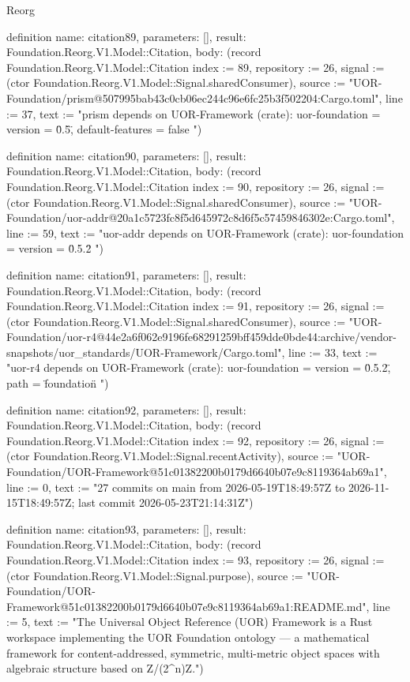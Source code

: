 \begin{lexlean}{Reorg}
\begin{semanticmodule}
definition{
  name: citation89,
  parameters: [],
  result: Foundation.Reorg.V1.Model::Citation,
  body: (record Foundation.Reorg.V1.Model::Citation {index := 89, repository := 26, signal := (ctor Foundation.Reorg.V1.Model::Signal.sharedConsumer), source := "UOR-Foundation/prism@507995bab43c0cb06ec244c96e6fc25b3f502204:Cargo.toml", line := 37, text := "prism depends on UOR-Framework (crate): uor-foundation = { version = \"0.5\", default-features = false }"})
}

definition{
  name: citation90,
  parameters: [],
  result: Foundation.Reorg.V1.Model::Citation,
  body: (record Foundation.Reorg.V1.Model::Citation {index := 90, repository := 26, signal := (ctor Foundation.Reorg.V1.Model::Signal.sharedConsumer), source := "UOR-Foundation/uor-addr@20a1c5723fc8f5d645972c8d6f5c57459846302e:Cargo.toml", line := 59, text := "uor-addr depends on UOR-Framework (crate): uor-foundation     = { version = \"0.5.2\" }"})
}

definition{
  name: citation91,
  parameters: [],
  result: Foundation.Reorg.V1.Model::Citation,
  body: (record Foundation.Reorg.V1.Model::Citation {index := 91, repository := 26, signal := (ctor Foundation.Reorg.V1.Model::Signal.sharedConsumer), source := "UOR-Foundation/uor-r4@44e2a6f062e9196fe68291259bff459dde0bde44:archive/vendor-snapshots/uor_standards/UOR-Framework/Cargo.toml", line := 33, text := "uor-r4 depends on UOR-Framework (crate): uor-foundation = { version = \"0.5.2\", path = \"foundation\" }"})
}

definition{
  name: citation92,
  parameters: [],
  result: Foundation.Reorg.V1.Model::Citation,
  body: (record Foundation.Reorg.V1.Model::Citation {index := 92, repository := 26, signal := (ctor Foundation.Reorg.V1.Model::Signal.recentActivity), source := "UOR-Foundation/UOR-Framework@51c01382200b0179d6640b07e9c8119364ab69a1", line := 0, text := "27 commits on main from 2026-05-19T18:49:57Z to 2026-11-15T18:49:57Z; last commit 2026-05-23T21:14:31Z"})
}

definition{
  name: citation93,
  parameters: [],
  result: Foundation.Reorg.V1.Model::Citation,
  body: (record Foundation.Reorg.V1.Model::Citation {index := 93, repository := 26, signal := (ctor Foundation.Reorg.V1.Model::Signal.purpose), source := "UOR-Foundation/UOR-Framework@51c01382200b0179d6640b07e9c8119364ab69a1:README.md", line := 5, text := "The Universal Object Reference (UOR) Framework is a Rust workspace implementing the UOR Foundation ontology — a mathematical framework for content-addressed, symmetric, multi-metric object spaces with algebraic structure based on Z/(2^n)Z."})
}


\end{semanticmodule}
\end{lexlean}
